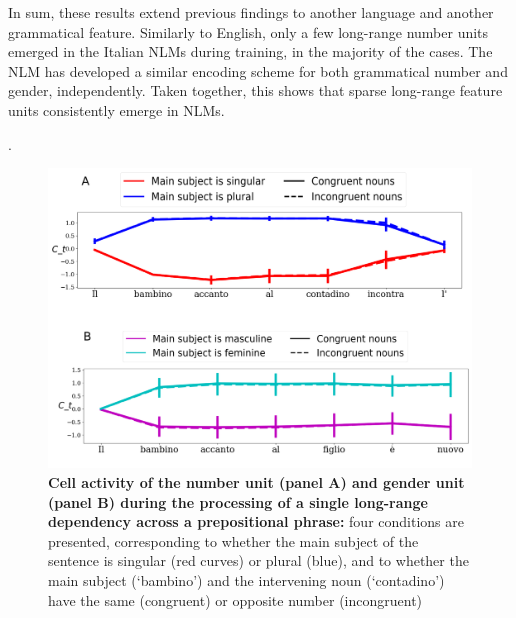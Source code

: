 \vspace{10pt}
In sum, these results extend previous findings to another language and another grammatical feature. Similarly to English, only a few long-range number units emerged in the Italian NLMs during training, in the majority of the cases. The NLM has developed a similar encoding scheme for both grammatical number and gender, independently. Taken together, this shows that sparse long-range feature units consistently emerge in NLMs.

. 

\begin{figure}
    \centering
    \includegraphics[width=\textwidth]{figures/model_activations_nounpp.png}
    \caption{\textbf{Cell activity of the number unit (panel A) and gender unit (panel B) during the processing of a single long-range dependency across a prepositional phrase:} four conditions are presented, corresponding to whether the main subject of the sentence is singular (red curves) or plural (blue), and to whether the main subject (`bambino') and the intervening noun (`contadino') have the same (congruent) or opposite number (incongruent)}
    \label{fig:nounpp}
\end{figure} 
